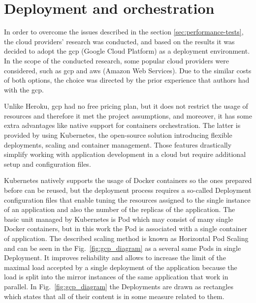 \section{Deployment and orchestration}\label{sec:deployment-and-orchestration}
In order to overcome the issues described in the section \ref{sec:performance-tests}, the cloud providers' research was conducted, and based on the results it was decided to adopt the \gls{gcp} (Google Cloud Platform) as a deployment environment.
In the scope of the conducted research, some popular cloud providers were considered, such as \gls{gcp} and \gls{aws} (Amazon Web Services).
Due to the similar costs of both options, the choice was directed by the prior experience that authors had with the \gls{gcp}.

Unlike Heroku, \gls{gcp} had no free pricing plan, but it does not restrict the usage of resources and therefore it met the project assumptions, and moreover, it has some extra advantages like native support for containers orchestration.
The latter is provided by using Kubernetes, the open-source solution introducing flexible deployments, scaling and container management.
Those features drastically simplify working with application development in a cloud but require additional setup and configuration files.

Kubernetes natively supports the usage of Docker containers so the ones prepared before can be reused, but the deployment process requires a so-called Deployment configuration files that enable tuning the resources assigned to the single instance of an application and also the number of the replicas of the application.
The basic unit managed by Kubernetes is Pod which may consist of many single Docker containers, but in this work the Pod is associated with a single container of application.
The described scaling method is known as Horizontal Pod Scaling and can be seen in the Fig.~\ref{fig:gcp_diagram} as a several same Pods in single Deployment.
It improves reliability and allows to increase the limit of the maximal load accepted by a single deployment of the application because the load is split into the mirror instances of the same application that work in parallel.
In Fig.~\ref{fig:gcp_diagram} the Deployments are drawn as rectangles which states that all of their content is in some measure related to them.

